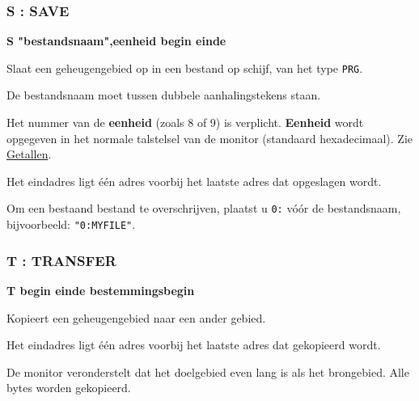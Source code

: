 
\subsubsection{S : SAVE}
\begin{description}[leftmargin=2cm,style=nextline]
\item [Formaat:] {\bf S "bestandsnaam",eenheid begin einde}\item [Gebruik:] Slaat een geheugengebied op in een bestand op schijf, van het type {\tt PRG}.

\item [Opmerkingen:] De bestandsnaam moet tussen dubbele aanhalingstekens staan.

    Het nummer van de {\bf eenheid} (zoals 8 of 9) is verplicht. {\bf Eenheid} wordt opgegeven in het normale talstelsel van de monitor (standaard hexadecimaal). Zie \hyperref[sec:numbers]{Getallen}.

    Het eindadres ligt één adres voorbij het laatste adres dat opgeslagen wordt.

    Om een bestaand bestand te overschrijven, plaatst u {\tt 0:} vóór de bestandsnaam, bijvoorbeeld: {\tt "0:MYFILE"}.

\end{description}


\subsubsection{T : TRANSFER}
\begin{description}[leftmargin=2cm,style=nextline]
\item [Formaat:] {\bf T begin einde bestemmingsbegin}\item [Gebruik:] Kopieert een geheugengebied naar een ander gebied.

\item [Opmerkingen:] Het eindadres ligt één adres voorbij het laatste adres dat gekopieerd wordt.

    De monitor veronderstelt dat het doelgebied even lang is als het brongebied. Alle bytes worden gekopieerd.

\end{description}

